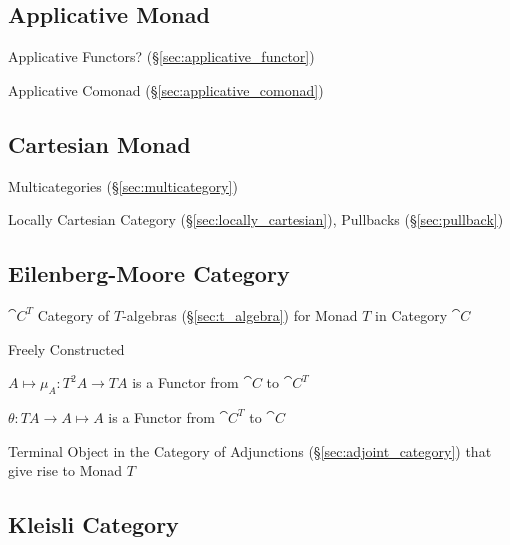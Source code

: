 \subsection{Applicative Monad}\label{sec:applicative_monad}

Applicative Functors? (\S\ref{sec:applicative_functor})

Applicative Comonad (\S\ref{sec:applicative_comonad})



\subsection{Cartesian Monad}\label{sec:cartesian_monad}

Multicategories (\S\ref{sec:multicategory})

Locally Cartesian Category (\S\ref{sec:locally_cartesian}), Pullbacks
(\S\ref{sec:pullback})



\subsection{Eilenberg-Moore Category}\label{sec:eilenberg_moore}

$\cat{C}^T$ Category of $T$-algebras (\S\ref{sec:t_algebra}) for
Monad $T$ in Category $\cat{C}$

Freely Constructed

$A \mapsto \mu_A : T^2 A \rightarrow T A$ is a Functor from
$\cat{C}$ to $\cat{C}^T$

$\theta : T A \rightarrow A \mapsto A$ is a Functor from
$\cat{C}^T$ to $\cat{C}$

Terminal Object in the Category of Adjunctions
(\S\ref{sec:adjoint_category}) that give rise to Monad $T$



\subsection{Kleisli Category}\label{sec:kleisli_category}

